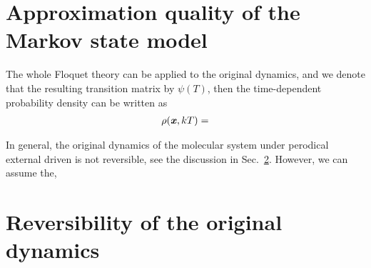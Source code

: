 \documentclass[aps, pre, preprint,unsortedaddress,a4paper,onecolumn]{revtex4}
\newcommand{\vect}[1]{\textbf{\textit{#1}}}
\begin{document}






\section{Approximation quality of the Markov state model}

The whole Floquet theory can be applied to the original dynamics, and we denote that the resulting transition matrix by $\psi(T)$, then
the time-dependent probability density can be written as
\begin{align*}
  \rho(\vect x, kT) = 
\end{align*}

In general, the original dynamics of the molecular system under perodical external driven
is not reversible, see the discussion in Sec.~\ref{sec:revs}. However, we can assume the, 



\section{Reversibility of the original dynamics}
\label{sec:revs}
\end{document}
